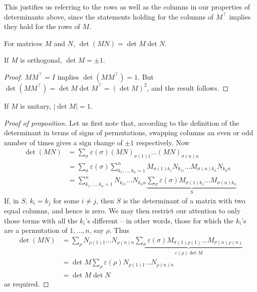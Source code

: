 \documentclass{../template/note}
\begin{document}
    \begin{remark*}
        This justifies us referring to the rows as well as the columns in our properties of determinants above, since the statements holding for the columns of \(M^\intercal\) implies they hold for the rows of \(M\).
    \end{remark*}
    
    \begin{proposition}
        For matrices \(M\) and \(N\), \(\det(MN) = \det M \det N\).
    \end{proposition}
    
    \begin{corollary}
        If \(M\) is orthogonal, \(\det M = \pm 1\).
    \end{corollary}
    
    \begin{proof}
        \(MM^\intercal = I\) implies \(\det(MM^\intercal) = 1\). But \(\det(MM^\intercal) = \det M \det M^\intercal = (\det M)^2\), and the result follows.
    \end{proof}
    
    \begin{corollary}
        If \(M\) is unitary, \(|\det M| = 1\).
    \end{corollary}

    
    \begin{proof}[Proof of proposition]
        Let us first note that, according to the definition of the determinant in terms of signs of permutations, swapping columns an even or odd number of times gives a sign change of \(\pm 1\) respectively. Now
        \begin{align*}
            \det(MN) &= \sum_\sigma \varepsilon(\sigma) (MN)_{\sigma(1)1} \dots (MN)_{\sigma(n)n} \\
            &= \sum_\sigma \varepsilon(\sigma) \sum_{k_1, \dots, k_n = 1}^n M_{\sigma(1)k_1}N_{k_11}\dots M_{\sigma(n)k_n}N_{k_nn} \\
            &= \sum_{k_1, \dots, k_n = 1}^n N_{k_11}\dots N_{k_nn} \underbrace{\sum_\sigma \varepsilon(\sigma) M_{\sigma(1)k_1}\dots M_{\sigma(n)k_n}}_{S}
        \end{align*}
        If, in \(S\), \(k_i = k_j\) for some \(i \neq j\), then \(S\) is the determinant of a matrix with two equal columns, and hence is zero. We may then restrict our attention to only those terms with all the \(k_i\)'s different -- in other words, those for which the \(k_i\)'s are a permutation of \(1, \dots, n\), say \(\rho\). Thus
        \begin{align*}
            \det(MN) &= \sum_\rho N_{\rho(1)1} \dots N_{\rho(n)n} \underbrace{\sum_\sigma \varepsilon(\sigma) M_{\sigma(1)\rho(1)} \dots M_{\sigma(n)\rho(n)}}_{\varepsilon(\rho) \det M} \\
            &= \det M \sum_\rho \varepsilon(\rho) N_{\rho(1) 1} \dots N_{\rho(n) n} \\
            &= \det M \det N
        \end{align*}
        as required.
    \end{proof}
    
\end{document}
